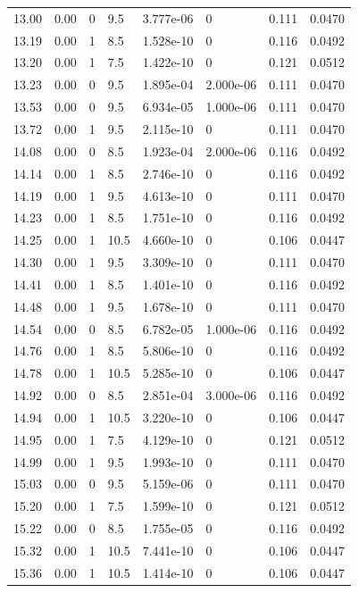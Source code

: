 \documentclass[preview]{standalone}
\begin{document}
{{{\begin{tabular}{L{1.2cm}C{1.2cm} C{0.3cm}C{0.5cm} C{1.4cm}C{1.4cm} C{1.4cm}C{1.4cm}}
  13.00  &  0.00  & 0     & 9.5 &  3.777e-06  & 0  & 0.111 &  0.0470   \\ 
  13.19  &  0.00  & 1     & 8.5 &  1.528e-10  & 0  & 0.116 &  0.0492   \\ 
  13.20  &  0.00  & 1     & 7.5 &  1.422e-10  & 0  & 0.121 &  0.0512   \\ 
  13.23  &  0.00  & 0     & 9.5 &  1.895e-04  & 2.000e-06  & 0.111 &  0.0470   \\ 
  13.53  &  0.00  & 0     & 9.5 &  6.934e-05  & 1.000e-06  & 0.111 &  0.0470   \\ 
  13.72  &  0.00  & 1     & 9.5 &  2.115e-10  & 0  & 0.111 &  0.0470   \\ 
  14.08  &  0.00  & 0     & 8.5 &  1.923e-04  & 2.000e-06  & 0.116 &  0.0492   \\ 
  14.14  &  0.00  & 1     & 8.5 &  2.746e-10  & 0  & 0.116 &  0.0492   \\ 
  14.19  &  0.00  & 1     & 9.5 &  4.613e-10  & 0  & 0.111 &  0.0470   \\ 
  14.23  &  0.00  & 1     & 8.5 &  1.751e-10  & 0  & 0.116 &  0.0492   \\ 
  14.25  &  0.00  & 1     & 10.5 &  4.660e-10  & 0  & 0.106 &  0.0447   \\ 
  14.30  &  0.00  & 1     & 9.5 &  3.309e-10  & 0  & 0.111 &  0.0470   \\ 
  14.41  &  0.00  & 1     & 8.5 &  1.401e-10  & 0  & 0.116 &  0.0492   \\ 
  14.48  &  0.00  & 1     & 9.5 &  1.678e-10  & 0  & 0.111 &  0.0470   \\ 
  14.54  &  0.00  & 0     & 8.5 &  6.782e-05  & 1.000e-06  & 0.116 &  0.0492   \\ 
  14.76  &  0.00  & 1     & 8.5 &  5.806e-10  & 0  & 0.116 &  0.0492   \\ 
  14.78  &  0.00  & 1     & 10.5 &  5.285e-10  & 0  & 0.106 &  0.0447   \\ 
  14.92  &  0.00  & 0     & 8.5 &  2.851e-04  & 3.000e-06  & 0.116 &  0.0492   \\ 
  14.94  &  0.00  & 1     & 10.5 &  3.220e-10  & 0  & 0.106 &  0.0447   \\ 
  14.95  &  0.00  & 1     & 7.5 &  4.129e-10  & 0  & 0.121 &  0.0512   \\ 
  14.99  &  0.00  & 1     & 9.5 &  1.993e-10  & 0  & 0.111 &  0.0470   \\ 
  15.03  &  0.00  & 0     & 9.5 &  5.159e-06  & 0  & 0.111 &  0.0470   \\ 
  15.20  &  0.00  & 1     & 7.5 &  1.599e-10  & 0  & 0.121 &  0.0512   \\ 
  15.22  &  0.00  & 0     & 8.5 &  1.755e-05  & 0  & 0.116 &  0.0492   \\ 
  15.32  &  0.00  & 1     & 10.5 &  7.441e-10  & 0  & 0.106 &  0.0447   \\ 
  15.36  &  0.00  & 1     & 10.5 &  1.414e-10  & 0  & 0.106 &  0.0447   \\ 
\hline 
\end{tabular} 

}}}
\end{document}
